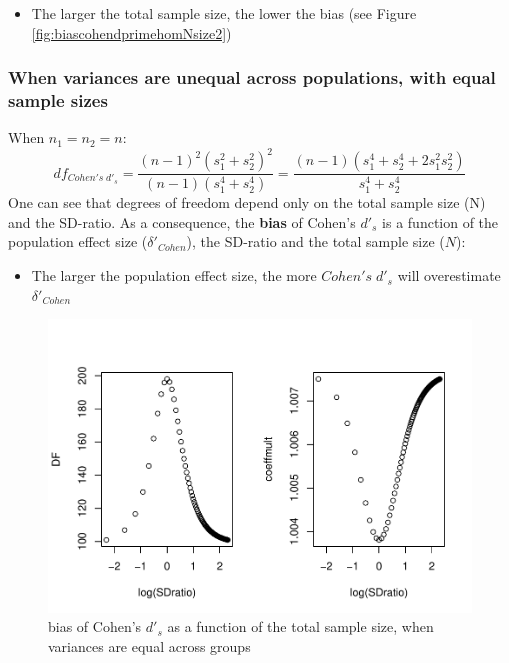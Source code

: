 \documentclass[
  man]{apa6}
\providecommand{\tightlist}{%
  \setlength{\itemsep}{0pt}\setlength{\parskip}{0pt}}
\begin{document}
\begin{itemize}
\tightlist
\item
  The larger the total sample size, the lower the bias (see Figure \ref{fig:biascohendprimehomNsize2})
\end{itemize}

\hypertarget{when-variances-are-unequal-across-populations-with-equal-sample-sizes}{%
\subsubsection{When variances are unequal across populations, with equal sample sizes}\label{when-variances-are-unequal-across-populations-with-equal-sample-sizes}}

When \(n_1=n_2=n\):
\[df_{Cohen's \; d'_s} = \frac{(n-1)^2(s^2_1+s^2_2)^2}{(n-1)(s^4_1+s^4_2)} =  \frac{(n-1)(s^4_1+s^4_2+2s^2_1s^2_2)}{s^4_1+s^4_2}\]
One can see that degrees of freedom depend only on the total sample size (N) and the SD-ratio. As a consequence, the \textbf{bias} of Cohen's \(d'_s\) is a function of the population effect size (\(\delta'_{Cohen}\)), the SD-ratio and the total sample size (\(N\)):

\begin{itemize}
\tightlist
\item
  The larger the population effect size, the more \(Cohen's \; d'_s\) will overestimate \(\delta'_{Cohen}\)
\end{itemize}

\begin{figure}
\centering
\includegraphics{Theoretical-Bias-and-variance,-as-a-function-of-population-parameters_files/figure-latex/biascohendprimehetbalSDratio2-1.pdf}
\caption{\label{fig:biascohendprimehetbalSDratio2}bias of Cohen's \(d'_s\) as a function of the total sample size, when variances are equal across groups}
\end{figure}
\end{document}
